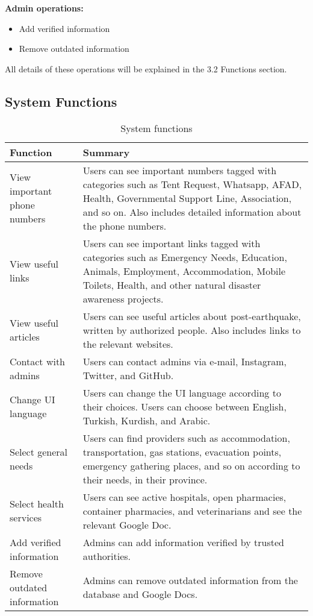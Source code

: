 \documentclass[listof=nochaptergap]{report}
\begin{document}
        \textbf{Admin operations:}
        \begin{itemize}
            \item Add verified information
            \item Remove outdated information
        \end{itemize}
        All details of these operations will be explained in the 3.2 Functions section.
    \subsection{System Functions}
    \begin{table}[H]
        \centering
        \begin{tabular}{| p{5cm} | p{10cm} |}
            \hline
            \textbf{Function} & \textbf{Summary} \\
            \hline
            View important phone numbers & Users can see important numbers tagged with categories such as Tent Request, Whatsapp, AFAD, Health, Governmental Support Line, Association, and so on. Also includes detailed information about the phone numbers. \\
            \hline
            View useful links & Users can see important links tagged with categories such as Emergency Needs, Education, Animals, Employment, Accommodation, Mobile Toilets, Health, and other natural disaster awareness projects. \\
            \hline
            View useful articles & Users can see useful articles about post-earthquake, written by authorized people. Also includes links to the relevant websites. \\
            \hline
            Contact with admins & Users can contact admins via e-mail, Instagram, Twitter, and GitHub. \\
            \hline
            Change UI language & Users can change the UI language according to their choices. Users can choose between English, Turkish, Kurdish, and Arabic. \\
            \hline
            Select general needs & Users can find providers such as accommodation, transportation, gas stations, evacuation points, emergency gathering places, and so on according to their needs, in their province.  \\
            \hline
            Select health services & Users can see active hospitals, open pharmacies, container pharmacies, and veterinarians and see the relevant Google Doc. \\
            \hline
            Add verified information & Admins can add information verified by trusted authorities. \\
            \hline
            Remove outdated information & Admins can remove outdated information from the database and Google Docs. \\
            \hline
        \end{tabular}
        \caption{System functions}
        \label{tab:table1}
    \end{table}
    
\end{document}
